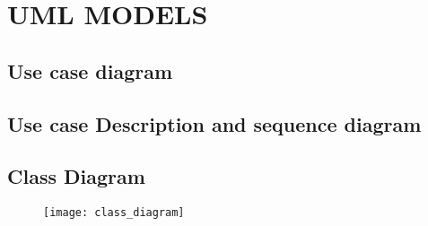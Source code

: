
\section{UML MODELS}
\subsection{Use case diagram}
\subsection{Use case Description and sequence diagram}
\subsection{Class Diagram}
\begin{figure}[h]
	\centering
	\texttt{[image: class\_diagram]}
\end{figure}